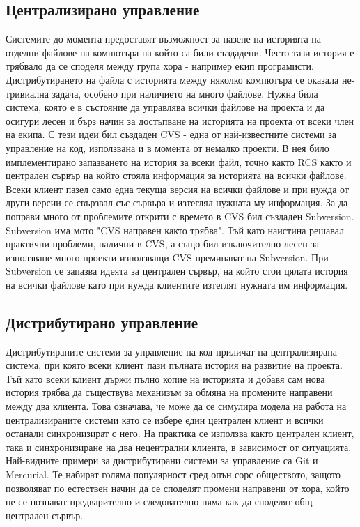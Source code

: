 \documentclass[a4paper]{article}
\begin{document}
  \subsection{Централизирано управление}
  Системите до момента предоставят възможност за пазене на историята на отделни
  файлове на компютъра на който са били създадени. Често тази история е
  трябвало да се споделя между група хора - например екип програмисти.
  Дистрибутирането на файла с историята между няколко компютъра се оказала
  не-тривиална задача, особено при наличието на много файлове. Нужна била
  система, която е в състояние да управлява всички файлове на проекта и да
  осигури лесен и бърз начин за достъпване на историята на проекта от всеки
  член на екипа. С тези идеи бил създаден CVS\cite{cvs} - една от
  най-известните системи за управление на код, използвана и в момента от
  немалко проекти. В нея било имплементирано запазването на история за всеки
  файл, точно както RCS както и централен сървър на който стояла информация за
  историята на всички файлове. Всеки клиент пазел само една текуща версия на
  всички файлове и при нужда от други версии се свързвал със сървъра и изтеглял
  нужната му информация. За да поправи много от проблемите открити с времето в
  CVS бил създаден Subversion\cite{svn}. Subversion има мото "CVS направен
  както трябва". Тъй като наистина решавал практични проблеми, налични в CVS, а
  също бил изключително лесен за използване много проекти използващи CVS
  преминават на Subversion. При Subversion се запазва идеята за централен
  сървър, на който стои цялата история на всички файлове като при нужда
  клиентите изтеглят нужната им информация.

  \subsection{Дистрибутирано управление}
  Дистрибутираните системи за управление на код приличат на централизирана
  система, при която всеки клиент пази пълната история на развитие на проекта.
  Тъй като всеки клиент държи пълно копие на историята и добавя сам нова
  история трябва да съществува механизъм за обмяна на промените направени между
  два клиента. Това означава, че може да се симулира модела на работа на
  централизираните системи като се избере един централен клиент и всички
  останали синхронизират с него. На практика се използва както централен
  клиент, така и синхронизиране на два нецентрални клиента, в зависимост от
  ситуацията. Най-видните примери за дистрибутирани системи за управление са
  Git\cite{git} и Mercurial\cite{mercurial}. Те набират голяма популярност сред
  опън сорс обществото, защото позволяват по естествен начин да се споделят
  промени направени от хора, който не се познават предварително и следователно
  няма как да споделят общ централен сървър.
\end{document}
